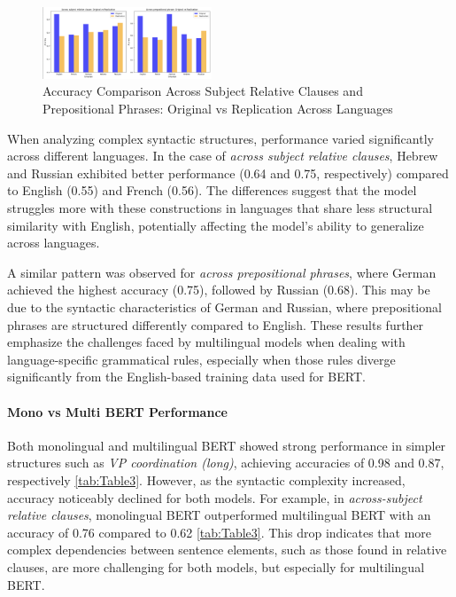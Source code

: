 \documentclass[11pt]{article}
\begin{document}
\begin{figure}[htbp]
    \centering
    \includegraphics[width=0.45\textwidth]{sr_prep_compare.png}
    \caption{Accuracy Comparison Across Subject Relative Clauses and Prepositional Phrases: Original vs Replication Across Languages}
    \label{fig:sr_pp_comparison}
\end{figure}

When analyzing complex syntactic structures, performance varied significantly across different languages. In the case of \textit{across subject relative clauses}, Hebrew and Russian exhibited better performance (0.64 and 0.75, respectively) compared to English (0.55) and French (0.56). The differences suggest that the model struggles more with these constructions in languages that share less structural similarity with English, potentially affecting the model’s ability to generalize across languages.

A similar pattern was observed for \textit{across prepositional phrases}, where German achieved the highest accuracy (0.75), followed by Russian (0.68). This may be due to the syntactic characteristics of German and Russian, where prepositional phrases are structured differently compared to English. These results further emphasize the challenges faced by multilingual models when dealing with language-specific grammatical rules, especially when those rules diverge significantly from the English-based training data used for BERT.


\paragraph{Mono vs Multi BERT Performance}
Both monolingual and multilingual BERT showed strong performance in simpler structures such as \textit{VP coordination (long)}, achieving accuracies of 0.98 and 0.87, respectively \autoref{tab:Table3}. However, as the syntactic complexity increased, accuracy noticeably declined for both models. For example, in \textit{across-subject relative clauses}, monolingual BERT outperformed multilingual BERT with an accuracy of 0.76 compared to 0.62 \autoref{tab:Table3}. This drop indicates that more complex dependencies between sentence elements, such as those found in relative clauses, are more challenging for both models, but especially for multilingual BERT.
\end{document}
